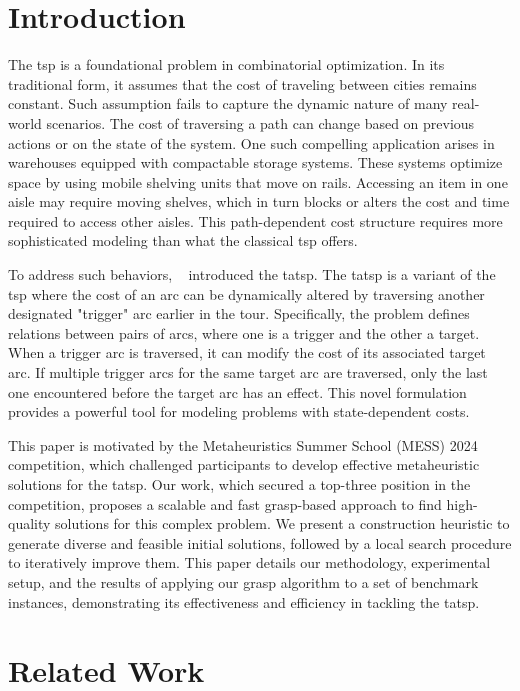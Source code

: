 \documentclass[twocolumn, switch]{article} %
\begin{document}
\section{Introduction}
The \gls{tsp} is a foundational problem in combinatorial optimization. In its traditional form, 
it assumes that the cost of traveling between cities remains constant.
Such assumption fails to capture the dynamic nature of many real-world scenarios. 
The cost of traversing a path can change based on previous actions or on the state of the system. 
One such compelling application arises in warehouses equipped with compactable storage systems. 
These systems optimize space by using mobile shelving units that move on rails. 
Accessing an item in one aisle may require moving shelves, which in turn blocks or alters the cost and time required to access other aisles. 
This path-dependent cost structure requires more sophisticated modeling than what the classical \gls{tsp} offers. 

To address such behaviors, ~\citet{Cerrone} introduced the \gls{tatsp}. 
The \gls{tatsp} is a variant of the \gls{tsp} where the cost of an arc can be dynamically altered by traversing another designated "trigger" arc earlier in the tour. 
Specifically, the problem defines relations between pairs of arcs, where one is a trigger and the other a target. 
When a trigger arc is traversed, it can modify the cost of its associated target arc. 
If multiple trigger arcs for the same target arc are traversed, only the last one encountered before the target arc has an effect. 
This novel formulation provides a powerful tool for modeling problems with state-dependent costs. 

This paper is motivated by the Metaheuristics Summer School (MESS) 2024 competition, which challenged participants to develop effective metaheuristic solutions for the \gls{tatsp}. 
Our work, which secured a top-three position in the competition, proposes a scalable and fast \gls{grasp}-based approach to find high-quality solutions for this complex problem. 
We present a construction heuristic to generate diverse and feasible initial solutions, followed by a local search procedure to iteratively improve them. 
This paper details our methodology, experimental setup, and the results of applying our \gls{grasp} algorithm to a set of benchmark instances, demonstrating its effectiveness and efficiency in tackling the \gls{tatsp}. 

\section{Related Work}
\label{sec:related_work}
\end{document}
